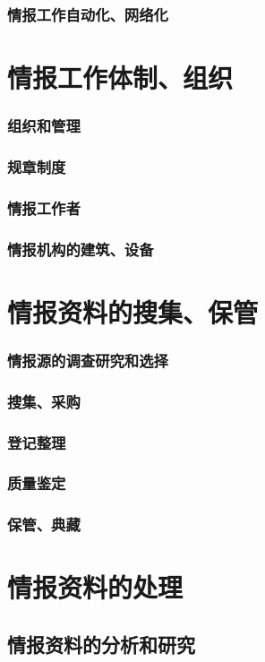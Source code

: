 \documentclass[UTF8]{../../ApplicationUniverse}
\begin{document}
    \subsubsection{情报工作自动化、网络化}
\section{情报工作体制、组织}
    \subsubsection{组织和管理}
    \subsubsection{规章制度}
    \subsubsection{情报工作者}
    \subsubsection{情报机构的建筑、设备}
\section{情报资料的搜集、保管}
    \subsubsection{情报源的调查研究和选择}
    \subsubsection{搜集、采购}
    \subsubsection{登记整理}
    \subsubsection{质量鉴定}
    \subsubsection{保管、典藏}
\section{情报资料的处理}
    \subsection{情报资料的分析和研究}
\end{document}
